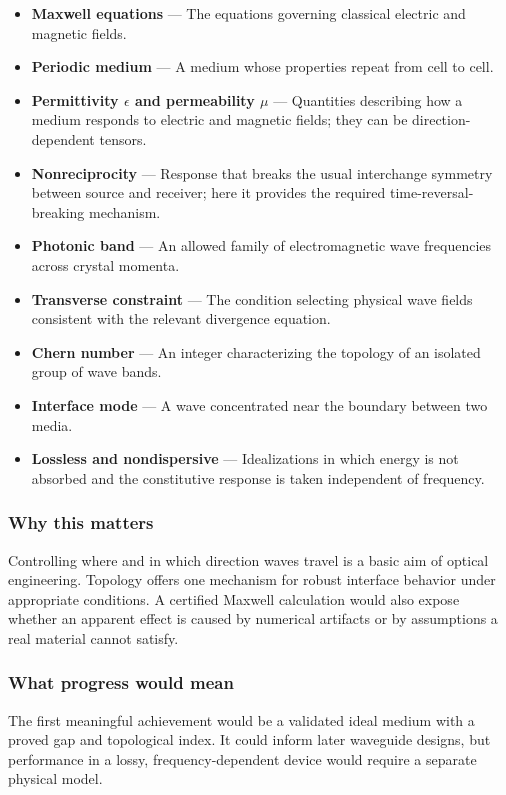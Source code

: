 \documentclass[
  11pt,
]{article}
\begin{document}
\begin{itemize}
\item
  \textbf{Maxwell equations} --- The equations governing classical
  electric and magnetic fields.
\item
  \textbf{Periodic medium} --- A medium whose properties repeat from
  cell to cell.
\item
  \textbf{Permittivity \ensuremath{\epsilon} and permeability
  \ensuremath{\mu}} --- Quantities describing how a medium responds to
  electric and magnetic fields; they can be direction-dependent tensors.
\item
  \textbf{Nonreciprocity} --- Response that breaks the usual interchange
  symmetry between source and receiver; here it provides the required
  time-reversal-breaking mechanism.
\item
  \textbf{Photonic band} --- An allowed family of electromagnetic wave
  frequencies across crystal momenta.
\item
  \textbf{Transverse constraint} --- The condition selecting physical
  wave fields consistent with the relevant divergence equation.
\item
  \textbf{Chern number} --- An integer characterizing the topology of an
  isolated group of wave bands.
\item
  \textbf{Interface mode} --- A wave concentrated near the boundary
  between two media.
\item
  \textbf{Lossless and nondispersive} --- Idealizations in which energy
  is not absorbed and the constitutive response is taken independent of
  frequency.
\end{itemize}

\subsubsection{Why this matters}

Controlling where and in which direction waves travel is a basic aim of
optical engineering. Topology offers one mechanism for robust interface
behavior under appropriate conditions. A certified Maxwell calculation
would also expose whether an apparent effect is caused by numerical
artifacts or by assumptions a real material cannot satisfy.

\subsubsection{What progress would mean}

The first meaningful achievement would be a validated ideal medium with
a proved gap and topological index. It could inform later waveguide
designs, but performance in a lossy, frequency-dependent device would
require a separate physical model.
\end{document}
